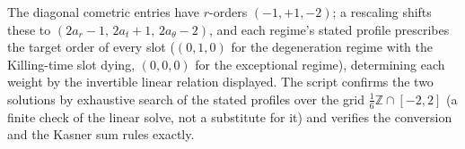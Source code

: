 The diagonal cometric entries have $r$-orders $(-1, +1, -2)$; a rescaling shifts these to $(2a_r - 1,\, 2a_t + 1,\, 2a_\theta - 2)$, and each regime's stated profile prescribes the target order of every slot ($(0, 1, 0)$ for the degeneration regime with the Killing-time slot dying, $(0,0,0)$ for the exceptional regime), determining each weight by the invertible linear relation displayed. The script confirms the two solutions by exhaustive search of the stated profiles over the grid $\tfrac16\mathbb{Z} \cap [-2,2]$ (a finite check of the linear solve, not a substitute for it) and verifies the conversion and the Kasner sum rules exactly.
